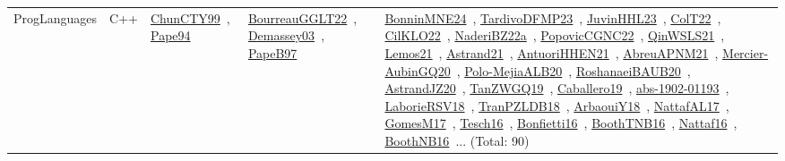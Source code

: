 {\begin{longtable}{lp{3cm}>{\raggedright\arraybackslash}p{6cm}>{\raggedright\arraybackslash}p{6cm}>{\raggedright\arraybackslash}p{8cm}}
\index{C++}\index{ProgLanguages!C++}ProgLanguages & C++ & \href{../works/ChunCTY99.pdf}{ChunCTY99}~\cite{ChunCTY99}, \href{../works/Pape94.pdf}{Pape94}~\cite{Pape94} & \href{../works/BourreauGGLT22.pdf}{BourreauGGLT22}~\cite{BourreauGGLT22}, \href{../works/Demassey03.pdf}{Demassey03}~\cite{Demassey03}, \href{../works/PapeB97.pdf}{PapeB97}~\cite{PapeB97} & \href{../works/BonninMNE24.pdf}{BonninMNE24}~\cite{BonninMNE24}, \href{../works/TardivoDFMP23.pdf}{TardivoDFMP23}~\cite{TardivoDFMP23}, \href{../works/JuvinHHL23.pdf}{JuvinHHL23}~\cite{JuvinHHL23}, \href{../works/ColT22.pdf}{ColT22}~\cite{ColT22}, \href{../works/CilKLO22.pdf}{CilKLO22}~\cite{CilKLO22}, \href{../works/NaderiBZ22a.pdf}{NaderiBZ22a}~\cite{NaderiBZ22a}, \href{../works/PopovicCGNC22.pdf}{PopovicCGNC22}~\cite{PopovicCGNC22}, \href{../works/QinWSLS21.pdf}{QinWSLS21}~\cite{QinWSLS21}, \href{../works/Lemos21.pdf}{Lemos21}~\cite{Lemos21}, \href{../works/Astrand21.pdf}{Astrand21}~\cite{Astrand21}, \href{../works/AntuoriHHEN21.pdf}{AntuoriHHEN21}~\cite{AntuoriHHEN21}, \href{../works/AbreuAPNM21.pdf}{AbreuAPNM21}~\cite{AbreuAPNM21}, \href{../works/Mercier-AubinGQ20.pdf}{Mercier-AubinGQ20}~\cite{Mercier-AubinGQ20}, \href{../works/Polo-MejiaALB20.pdf}{Polo-MejiaALB20}~\cite{Polo-MejiaALB20}, \href{../works/RoshanaeiBAUB20.pdf}{RoshanaeiBAUB20}~\cite{RoshanaeiBAUB20}, \href{../works/AstrandJZ20.pdf}{AstrandJZ20}~\cite{AstrandJZ20}, \href{../works/TanZWGQ19.pdf}{TanZWGQ19}~\cite{TanZWGQ19}, \href{../works/Caballero19.pdf}{Caballero19}~\cite{Caballero19}, \href{../works/abs-1902-01193.pdf}{abs-1902-01193}~\cite{abs-1902-01193}, \href{../works/LaborieRSV18.pdf}{LaborieRSV18}~\cite{LaborieRSV18}, \href{../works/TranPZLDB18.pdf}{TranPZLDB18}~\cite{TranPZLDB18}, \href{../works/ArbaouiY18.pdf}{ArbaouiY18}~\cite{ArbaouiY18}, \href{../works/NattafAL17.pdf}{NattafAL17}~\cite{NattafAL17}, \href{../works/GomesM17.pdf}{GomesM17}~\cite{GomesM17}, \href{../works/Tesch16.pdf}{Tesch16}~\cite{Tesch16}, \href{../works/Bonfietti16.pdf}{Bonfietti16}~\cite{Bonfietti16}, \href{../works/BoothTNB16.pdf}{BoothTNB16}~\cite{BoothTNB16}, \href{../works/Nattaf16.pdf}{Nattaf16}~\cite{Nattaf16}, \href{../works/BoothNB16.pdf}{BoothNB16}~\cite{BoothNB16}... (Total: 90)\\

\end{longtable}}
